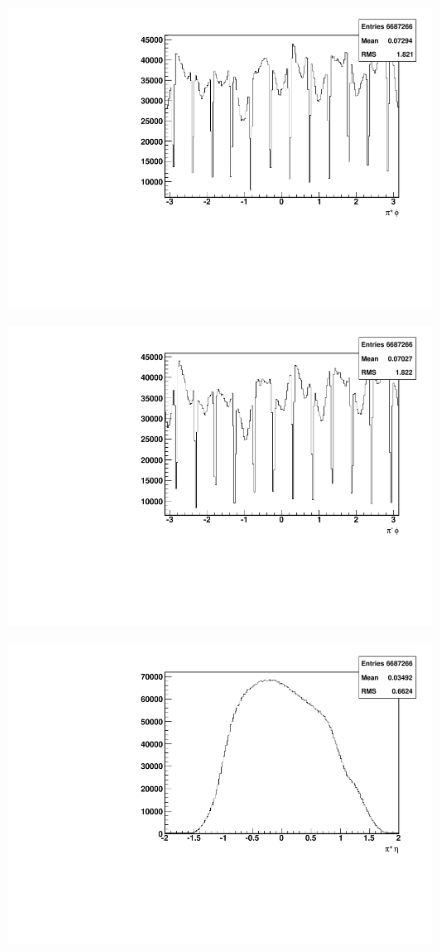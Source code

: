 \documentclass[abstract = on,listof=totoc, bibliography=totoc]{scrreprt}
\begin{document}
\begin{figure}
\begin{center}
\includegraphics[width = .8\textwidth]{hPosPhi}
\caption[$\phi$ distribution of $\pi^+$]{}
\label{fig:}
\end{center}
\end{figure}

\begin{figure}
\begin{center}
\includegraphics[width = .8\textwidth]{hNegPhi}
\caption[$\phi$ distribution of $\pi^-$]{}
\label{fig:}
\end{center}
\end{figure}

\begin{figure}
\begin{center}
\includegraphics[width = .8\textwidth]{hPosEta}
\caption[$\eta$ distribution of $\pi^+$]{}
\label{fig:}
\end{center}
\end{figure}
\end{document}
